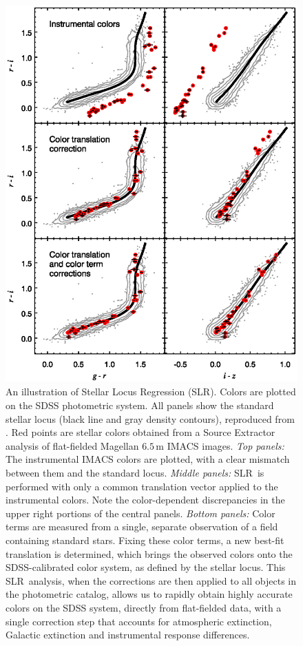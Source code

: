 \documentclass{report}
\newcommand{\sdss}{SDSS}
\newcommand{\slr}{SLR}
\begin{document}
\begin{figure}
  \center
  \includegraphics[scale=0.6]{fig/illus_sptcl2332_5051_locus_threepanel.eps}
  \caption{ An illustration of Stellar Locus Regression (\slr).
    Colors are plotted on the SDSS photometric system. All panels show
    the standard stellar locus (black line and gray density contours),
    reproduced from \citet{bib:covey}.  Red points are stellar colors
    obtained from a Source Extractor analysis of flat-fielded Magellan
    $6.5\,\mathrm{m}$ IMACS images.  {\it Top panels:} The
    instrumental IMACS colors are plotted, with a clear mismatch
    between them and the standard locus. {\it Middle panels:} \slr\ is
    performed with only a common translation vector applied to the
    instrumental colors.  Note the color-dependent discrepancies in
    the upper right portions of the central panels.  {\it Bottom
      panels:} Color terms are measured from a single, separate
    observation of a field containing standard stars. Fixing these
    color terms, a new best-fit translation is determined, which
    brings the observed colors onto the \sdss-calibrated color system,
    as defined by the stellar locus.  This \slr\ analysis, when the
    corrections are then applied to all objects in the photometric
    catalog, allows us to rapidly obtain highly accurate colors on the
    SDSS system, directly from flat-fielded data, with a single
    correction step that accounts for atmospheric extinction, Galactic
    extinction and instrumental response differences.}
 \label{fig:example}
\end{figure}
\end{document}
